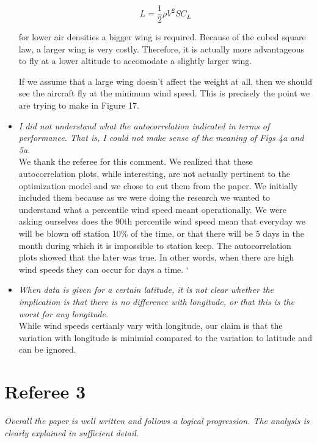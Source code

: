 \documentclass[10pt, a4paper]{article}
\begin{document}
\begin{itemize}
    \begin{equation}
        L = \frac{1}{2} \rho V^2 S C_L
    \end{equation}

    for lower air densities a bigger wing is required.  Because of the cubed square law, a larger wing is very costly.  Therefore, it is actually more advantageous to fly at a lower altitude to accomodate a slightly larger wing.  

    If we assume that a large wing doesn't affect the weight at all, then we should see the aircraft fly at the minimum wind speed.  This is precisely the point we are trying to make in Figure 17.  

    \item \emph{I did not understand what the autocorrelation indicated in terms of performance. That is, I could not make sense of the meaning of Figs 4a and 5a.} \\
        We thank the referee for this comment.  We realized that these autocorrelation plots, while interesting, are not actually pertinent to the optimization model and we chose to cut them from the paper.  We initially included them because as we were doing the research we wanted to understand what a percentile wind speed meant operationally.  We were asking ourselves does the 90th percentile wind speed mean that everyday we will be blown off station 10\% of the time, or that there will be 5 days in the month during which it is impossible to station keep.  The autocorrelation plots showed that the later was true.  In other words, when there are high wind speeds they can occur for days a time. `

    \item \emph{When data is given for a certain latitude, it is not clear whether the implication is that there is no difference with longitude, or that this is the worst for any longitude.} \\
        While wind speeds certianly vary with longitude, our claim is that the variation with longitude is minimial compared to the variation to latitude and can be ignored.  

    \end{itemize}

\section*{Referee 3}
\emph{Overall the paper is well written and follows a logical progression. The analysis is clearly explained in sufficient detail. }
\end{document}
